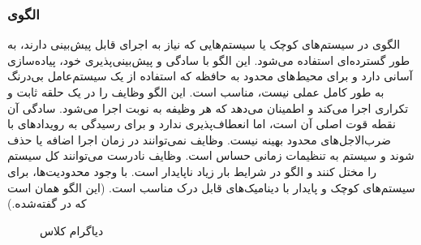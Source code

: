 \subsubsection{الگوی }
\label{archConCyclicExecSec}
\begin{RTL}
الگوی  \cite{ref4} در سیستم‌های کوچک
یا سیستم‌هایی که نیاز به اجرای قابل پیش‌بینی دارند، به طور گسترده‌ای استفاده می‌شود.
این الگو با سادگی و پیش‌بینی‌پذیری خود، پیاده‌سازی آسانی دارد و برای محیط‌های محدود به
حافظه که استفاده از یک سیستم‌عامل بی‌درنگ به طور
کامل عملی نیست، مناسب است. این الگو وظایف
را در یک حلقه ثابت و تکراری اجرا می‌کند و اطمینان می‌دهد که هر
وظیفه به نوبت اجرا می‌شود. سادگی آن نقطه قوت اصلی آن
است، اما انعطاف‌پذیری ندارد و برای رسیدگی به رویدادهای با ضرب‌الاجل‌های
محدود بهینه نیست. وظایف نمی‌توانند در زمان اجرا اضافه یا
حذف شوند و سیستم به تنظیمات زمانی حساس است.
وظایف نادرست می‌توانند کل سیستم را مختل کنند و
الگو در شرایط بار زیاد ناپایدار است. با وجود محدودیت‌ها، برای
سیستم‌های کوچک و پایدار با دینامیک‌های قابل درک مناسب است.
(این الگو همان  است که
در \cite{ref1} گفته‌شده.)
\end{RTL}
\begin{figure}[h!]
\centering
{}
\caption{دیاگرام کلاس }
\label{archConCyclicExecClassDiag}
\end{figure}